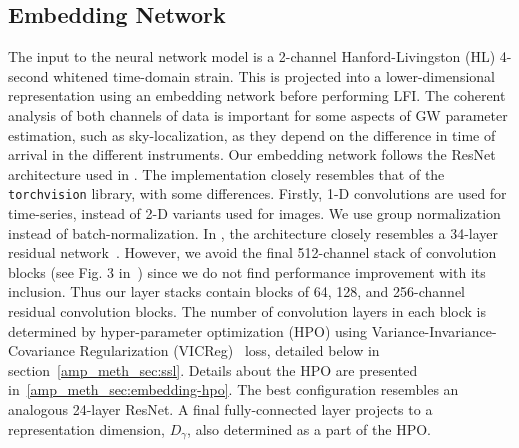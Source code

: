 \begin{refsection}
\section{Embedding Network}
\label{amp_meth_sec:embedding-net}
The input to the neural network model is a 2-channel Hanford-Livingston (HL) 4-second whitened time-domain strain. 
This is projected into a lower-dimensional representation using an embedding network before performing LFI.
The coherent analysis of both channels of data is important for some aspects of GW parameter estimation, such as sky-localization, as they depend on the difference in time of arrival in the different instruments. 
Our embedding network follows the ResNet architecture used in \aframe.
The implementation closely resembles that of the \texttt{torchvision} library, with some differences.
Firstly, {1-D} convolutions are used for time-series, instead of {2-D} variants used for images. 
We use group normalization~\cite{wu2018groupnormalization} instead of batch-normalization.
In \aframe, the architecture closely resembles a 34-layer residual network~\cite{he2015deepresiduallearningimage}.
However, we avoid the final 512-channel stack of convolution blocks (see Fig. 3 in~\cite{he2015deepresiduallearningimage}) since we do not find performance improvement with its inclusion. 
Thus our layer stacks contain blocks of 64, 128, and 256-channel residual convolution blocks. 
The number of convolution layers in each block is determined by hyper-parameter optimization (HPO) using Variance-Invariance-Covariance Regularization (VICReg)~\cite{bardes2022vicreg} loss, detailed below in section~\ref{amp_meth_sec:ssl}.
Details about the HPO are presented in~\ref{amp_meth_sec:embedding-hpo}. 
The best configuration resembles an analogous 24-layer ResNet. 
A final fully-connected layer projects to a representation dimension, $D_{\gamma}$, also determined as a part of the HPO.


\end{refsection}
